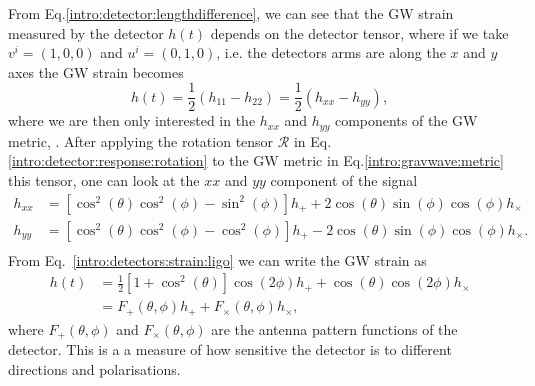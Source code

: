 From Eq.\ref{intro:detector:lengthdifference}, we can see that the \gls{GW} strain measured by the detector $h(t)$ depends on the detector tensor, where if we take $v^i = (1,0,0)$ and $u^i = (0,1,0)$, i.e. the detectors arms are along the $x$ and $y$ axes the \gls{GW} strain becomes 
\begin{equation}
    \label{intro:detectors:strain:ligo}
    h(t) = \frac{1}{2} \left( h_{11} - h_{22} \right) = \frac{1}{2} \left( h_{xx} - h_{yy} \right),
\end{equation}
where we are then only interested in the $h_{xx}$ and $h_{yy}$ components of the \gls{GW} metric, \citep{maggioreGravitationalWaves}.
After applying the rotation tensor $\mathcal{R}$ in Eq.\ref{intro:detector:response:rotation} to the \gls{GW} metric in Eq.\ref{intro:gravwave:metric} this tensor, one can look at the $xx$ and $yy$ component of the signal
\begin{equation}
    \begin{split}
        h_{xx} &= \left[ \cos^2(\theta) \cos^2 (\phi) - \sin^2 (\phi)\right]h_{+} + 2\cos (\theta) \sin (\phi) \cos (\phi) h_{\times}\\
        h_{yy} &= \left[ \cos^2(\theta) \cos^2 (\phi) - \cos^2 (\phi)\right]h_{+} - 2\cos(\theta) \sin (\phi) \cos(\phi) h_{\times} . \\
    \end{split}
\end{equation}
From Eq.~\ref{intro:detectors:strain:ligo} we can write the \gls{GW} strain as
\begin{equation}
    \label{intro:detector:response:strain:polarisations}
    \begin{split}
        h(t) &= \frac{1}{2} \left[ 1 + \cos^2 \left(\theta\right) \right] \cos\left(2\phi\right) h_{+} + \cos \left(\theta\right) \cos \left(2\phi \right)h_{\times}\\
        &= F_{+}(\theta,\phi)h_{+} + F_{\times}(\theta,\phi)h_{\times},
    \end{split}
\end{equation}
where $F_{+}(\theta,\phi)$ and $F_{\times}(\theta,\phi)$ are the antenna pattern functions of the detector.
This is a a measure of how sensitive the detector is to different directions and polarisations. 

